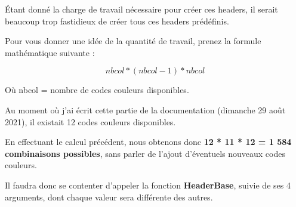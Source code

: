 \documentclass[a4paper,10pt]{article}
\begin{document}
\begin{justify}
    Étant donné la charge de travail nécessaire pour créer ces headers, il serait beaucoup trop fastidieux de créer tous ces headers prédéfinis.
\end{justify}

\begin{justify}
    Pour vous donner une idée de la quantité de travail, prenez la formule mathématique suivante :
\end{justify}

\[nbcol * (nbcol - 1) * nbcol\]

\begin{justify}
    Où nbcol = nombre de codes couleurs disponibles.
\end{justify}

\begin{justify}
    Au moment où j'ai écrit cette partie de la documentation (dimanche 29 août 2021), il existait 12 codes couleurs disponibles.
\end{justify}

\begin{justify}
    En effectuant le calcul précédent, nous obtenons donc \textbf{12 * 11 * 12 = 1 584 combinaisons possibles}, sans parler de l'ajout d'éventuels nouveaux codes couleurs.
\end{justify}

\begin{justify}
    Il faudra donc se contenter d'appeler la fonction \textbf{\color{mauve}HeaderBase\color{white}}, suivie de ses 4 arguments, dont chaque valeur sera différente des autres.
\end{justify}
\end{document}

